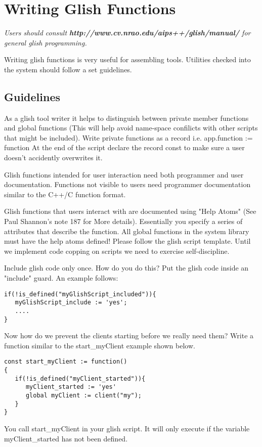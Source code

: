 \chapter{Writing Glish Functions\label{Useful.GlishFunctions}}

\textit{Users should consult \textbf{
{http://www.cv.nrao.edu/aips++/glish/manual/}}
for general glish programming.}

Writing glish functions is very useful for assembling \aipspp
tools.  Utilities checked into the system should follow a set 
guidelines.  

\section{Guidelines}

As a glish tool writer it helps to distinguish between private member functions
and global functions (This will help avoid name-space confilicts
with other scripts that might be included).
Write private functions as a record  i.e.  app.function := function
At the end of the script declare the record const to make sure a user
doesn't accidently overwrites it.

Glish functions intended for user interaction need both
programmer and user documentation.  Functions not visible to users
need programmer documentation similar to the C++/C function format.

Glish functions that users interact with are documented using "Help Atoms"
(See Paul Shannon's
note 187 for More details).  Essentially you specify a series of attributes
that describe the function.
All global functions in the system library must have the help atoms defined!
Please follow the glish script template.
Until we implement code copping on \aipspp scripts we need to exercise
self-discipline.

Include glish code only once.  How do you do this?  Put the glish code 
inside an "include" guard.  An example follows:
\begin{verbatim}
if(!is_defined("myGlishScript_included")){
   myGlishScript_include := 'yes';
   ....
}
\end{verbatim}

Now how do we prevent the clients starting 
before we really need them?  Write a function similar to the
start\_myClient example shown below.

\begin{verbatim}
const start_myClient := function()
{
   if(!is_defined("myClient_started")){
      myClient_started := 'yes'
      global myClient := client("my");
   }
}
\end{verbatim}
You call start\_myClient in your glish script.  It will only execute if the
variable myClient\_started has not been defined.


